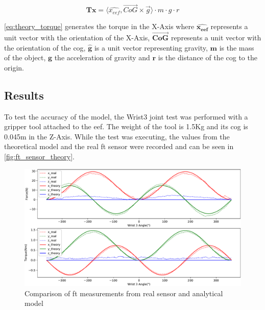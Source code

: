 \begin{figure}[h]
    \begin{equation}
        \mathbf{Tx} = \langle\hat{x_{eef}} , \vec{CoG} \times \vec{g} \rangle \cdot m \cdot g\cdot r
        \label{eq:theory_torque}
    \end{equation}
\end{figure}

\par \autoref{eq:theory_torque} generates the torque in the X-Axis where $\mathbf{\hat{x_{eef}}}$ represents a unit vector with the orientation of the X-Axis, $\mathbf{\vec{CoG}}$ represents a unit vector with the orientation of the \ac{cog}, $\mathbf{\hat{g}}$ is a unit vector representing gravity, $\mathbf{m}$ is the mass of the object, $\mathbf{g}$ the acceleration of gravity and $\mathbf{r}$ is the distance of the \ac{cog} to the origin.

\subsection{Results}
\label{ssec:ft_theory_results}

\par To test the accuracy of the model, the Wrist3 joint test was performed with a gripper tool attached to the \ac{eef}. The weight of the tool is 1.5Kg and its \ac{cog} is 0.045m in the Z-Axis. While the test was executing, the values from the theoretical model and the real \ac{ft} sensor were recorded and can be seen in \autoref{fig:ft_sensor_theory}.


\begin{figure}[h]
    \centering
    \includegraphics[width=0.8\linewidth]{figs/chp3/ft_sensor_theory.pdf}
    \caption{Comparison of \ac{ft} measurements from real sensor and analytical model}
    \label{fig:ft_sensor_theory}
\end{figure}

